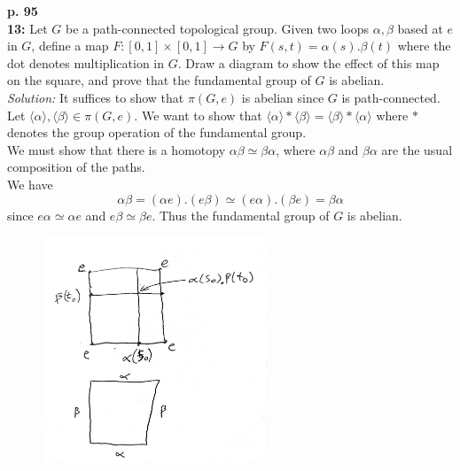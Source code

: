 \documentclass[a4paper]{article}
\begin{document}
    \textbf{p. 95}\\
    \textbf{13:} Let $G$ be a path-connected topological group.
    Given two loops $\alpha, \beta$ based at $e$ in $G$,
    define a map $F  \colon \left[ 0,1 \right] \times 
    \left[ 0,1 \right]  \to G$ by 
    $F(s,t) = \alpha(s). \beta(t)$ where
    the dot denotes multiplication in $G$. Draw a diagram to show
    the effect of this map on the square, and prove that the
    fundamental group of $G$ is abelian.\\
    \linebreak
    \textit{Solution:} 
    It suffices to show that
    $\pi (G, e)$ is abelian since $G$ is path-connected.\\
    \linebreak
    Let $\langle \alpha \rangle, \langle \beta
    \rangle \in \pi (G, e)$. We want to show that
    $\langle \alpha \rangle * 
    \langle \beta \rangle =\langle \beta \rangle
    * \langle \alpha \rangle$ where $*$ denotes the
    group operation of the fundamental group.\\
    \linebreak
    We must show that
    there is a homotopy
    $\alpha  \beta \simeq \beta  \alpha$, where
    $\alpha \beta$ and $\beta \alpha$ are the usual composition of the paths.\\
    We have
    \[
    \alpha \beta = (\alpha e). (e \beta)
    \simeq (e \alpha). (\beta e)
    = \beta \alpha
    \] 
    since $e \alpha \simeq \alpha e$ and
    $e \beta \simeq \beta e$. Thus
    the fundamental group of $G$ is abelian.
    
   \begin{figure}[H]
       \centering
       \includegraphics[width=0.6\textwidth]{2.jpeg}
       \label{fig:2-jpeg}
   \end{figure} 




    
\end{document}
